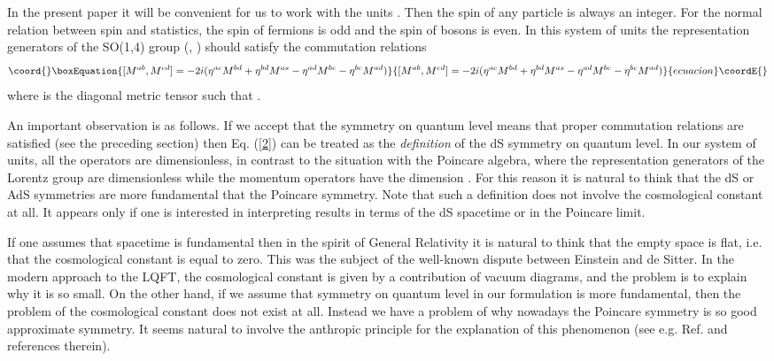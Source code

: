 \documentclass[a4paper,12pt]{article}%
\begin{document}
\begin{sloppypar}
In the present paper it will be convenient for us to work with 
the units \coordHE{}. Then the spin of any particle is
always an integer. For the normal relation between spin and 
statistics, the spin of fermions is odd and the spin of bosons
is even. In this system of units the representation generators 
of the SO(1,4) group
\coordHE{} (\coordHE{}, \coordHE{}) should satisfy the
commutation relations
\begin{equation}\coord{}\boxEquation{
[M^{ab},M^{cd}]=-2i (\eta^{ac}M^{bd}+\eta^{bd}M^{as}-
\eta^{ad}M^{bc}-\eta^{bc}M^{ad})
\label{2}
}{
[M^{ab},M^{cd}]=-2i (\eta^{ac}M^{bd}+\eta^{bd}M^{as}-
\eta^{ad}M^{bc}-\eta^{bc}M^{ad})
}{ecuacion}\coordE{}\end{equation}
where \coordHE{} is the diagonal metric tensor such that
\coordHE{}.
\end{sloppypar}

An important observation is as follows. If we accept that the
symmetry on quantum level means that proper commutation relations
are satisfied (see the preceding section) then Eq. (\ref{2})
can be treated as the {\it definition} of the dS symmetry on quantum
level. In our system of units, all the operators \coordHE{} are 
dimensionless, in contrast to the situation with the Poincare
algebra, where the representation generators of the Lorentz
group are dimensionless while the momentum operators have the
dimension \coordHE{}. For this reason it is natural to
think that the dS or AdS symmetries are more fundamental that
the Poincare symmetry. Note that such a definition does not
involve the cosmological constant at all. It appears only if 
one is interested in interpreting results in terms of
the dS spacetime or in the Poincare limit.

If one assumes that spacetime is fundamental then in the 
spirit of General Relativity it is natural to think that 
the empty space is flat, i.e. that the cosmological 
constant is equal to zero. This was the subject of the 
well-known dispute between Einstein and de Sitter. In the 
modern approach to the LQFT, the cosmological constant 
is given by a contribution of vacuum diagrams, 
and the problem is to explain why it is so small. On the 
other hand, if we assume that symmetry on quantum level in 
our formulation is more fundamental, then the problem of 
the cosmological constant does not exist at all. Instead we 
have a problem of why nowadays the Poincare symmetry is so 
good approximate symmetry. It seems natural to 
involve the anthropic principle for the explanation of 
this phenomenon (see e.g. Ref. \cite{Linde} and references 
therein).
\end{document}
